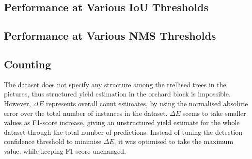 \subsection{Performance at Various IoU Thresholds}
\subsection{Performance at Various NMS Thresholds}
\subsection{Counting}
The dataset does not specify any structure among the trellised trees in the pictures, thus structured yield estimation in the orchard block is impossible. However, $\Delta E$ represents overall count estimates, by using the normalised absolute error over the total number of instances in the dataset. $\Delta E$ seems to take smaller values as F1-score increase, giving an unstructured yield estimate for the whole dataset through the total number of predictions. Instead of tuning the detection confidence threshold to minimise $\Delta E$, it was optimised to take the maximum value, while keeping F1-score unchanged.
